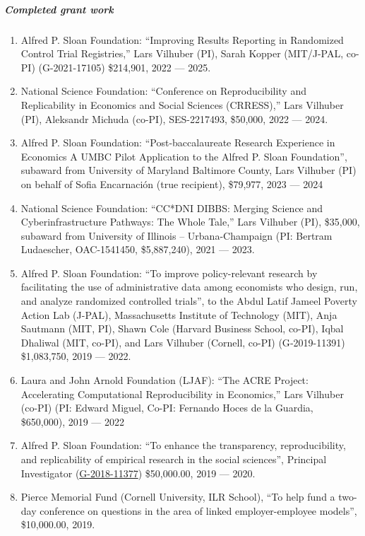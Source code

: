 \documentclass[10pt,letterpaper]{report}
\begin{document}
\subparagraph{Completed grant work}
\begin{enumerate}
 	
	\item Alfred P. Sloan Foundation: ``Improving Results Reporting in Randomized Control Trial Registries,'' Lars Vilhuber (PI), Sarah Kopper (MIT/J-PAL, co-PI) (G-2021-17105) \$214,901, 2022 --- 2025.
  \item National Science Foundation: ``Conference on Reproducibility and Replicability in Economics and Social Sciences (CRRESS),'' Lars Vilhuber (PI), Aleksandr Michuda (co-PI), SES-2217493, \$50,000,  2022 --- 2024.
  \item Alfred P. Sloan Foundation: ``Post-baccalaureate Research Experience in Economics A UMBC Pilot Application to the Alfred P. Sloan Foundation'', subaward from University of Maryland Baltimore County, Lars Vilhuber (PI) on behalf of Sofia Encarnación (true recipient), \$79,977, 2023 --- 2024

	\item National Science Foundation: ``CC*DNI DIBBS: Merging Science and Cyberinfrastructure Pathways: The Whole Tale,'' Lars Vilhuber (PI),  \$35,000, subaward from University of Illinois -- Urbana-Champaign (PI: Bertram Ludaescher, OAC-1541450, \$5,887,240), 2021 --- 2023.
  \item Alfred P. Sloan Foundation: ``To improve policy-relevant research by facilitating the use of administrative data among economists who design, run, and analyze randomized controlled trials'', to the Abdul Latif Jameel Poverty Action	Lab (J-PAL), Massachusetts Institute	of Technology (MIT), Anja Sautmann (MIT, PI), Shawn Cole (Harvard Business School, co-PI), Iqbal Dhaliwal (MIT, co-PI), and Lars Vilhuber (Cornell, co-PI) (G‐2019-11391) \$1,083,750, 2019 --- 2022.
	\item Laura and John Arnold Foundation (LJAF): ``The ACRE Project: Accelerating Computational Reproducibility in Economics,'' Lars Vilhuber (co-PI) (PI: Edward Miguel, Co-PI: Fernando Hoces de la Guardia, \$650,000), 2019 --- 2022
	\item Alfred P. Sloan Foundation: ``To enhance the transparency, reproducibility, and replicability of empirical research in the social sciences'', Principal Investigator  (\href{https://sloan.org/grant-detail/8801}{G-2018-11377})  \$50,000.00, 2019 --- 2020.

	\item Pierce Memorial Fund (Cornell University, ILR School), ``To help fund a two-day conference on questions in the area of linked employer-employee models'', \$10,000.00, 2019.


\end{enumerate}
\end{document}
